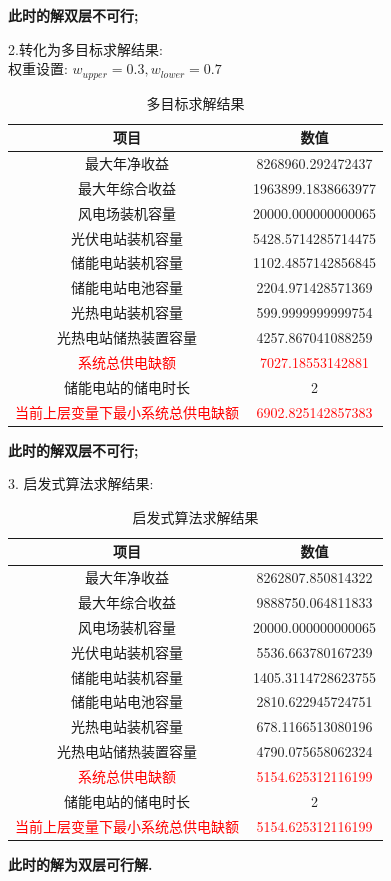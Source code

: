 \documentclass{article}
\begin{document}
\bf{此时的解双层不可行};
    
2.转化为多目标求解结果: \\
权重设置: $w_{upper}=0.3, w_{lower}=0.7$

\begin{table}[H]
    \centering
    \caption{多目标求解结果}
    \label{tab:multi_objective_result}
    \begin{tabular}{c|c}
        \toprule
        \textbf{项目} & \textbf{数值} \\
        \midrule
        最大年净收益 & 8268960.292472437 \\
        最大年综合收益 & 1963899.1838663977 \\
        风电场装机容量 & 20000.000000000065 \\
        光伏电站装机容量 & 5428.5714285714475 \\
        储能电站装机容量 & 1102.4857142856845 \\
        储能电站电池容量 & 2204.971428571369 \\
        光热电站装机容量 & 599.9999999999754 \\
        光热电站储热装置容量 & 4257.867041088259 \\
        \textcolor{red}{系统总供电缺额} & \textcolor{red}{7027.18553142881} \\
        储能电站的储电时长 & 2 \\
        \textcolor{red}{当前上层变量下最小系统总供电缺额} & \textcolor{red}{6902.825142857383} \\
        \bottomrule
    \end{tabular}
\end{table}

\bf{此时的解双层不可行};

3. 启发式算法求解结果:
\begin{table}[H]
    \centering
    \caption{启发式算法求解结果}
    \label{tab:heuristic_result}
    \begin{tabular}{c|c}
        \toprule
        \textbf{项目} & \textbf{数值} \\
        \midrule
        最大年净收益 & 8262807.850814322 \\
        最大年综合收益 & 9888750.064811833 \\
        风电场装机容量 & 20000.000000000065 \\
        光伏电站装机容量 & 5536.663780167239 \\
        储能电站装机容量 & 1405.3114728623755 \\
        储能电站电池容量 & 2810.622945724751 \\
        光热电站装机容量 & 678.1166513080196 \\
        光热电站储热装置容量 & 4790.075658062324 \\
        \textcolor{red}{系统总供电缺额} & \textcolor{red}{5154.625312116199} \\
        储能电站的储电时长 & 2 \\
        \textcolor{red}{当前上层变量下最小系统总供电缺额} & \textcolor{red}{5154.625312116199} \\
        \bottomrule
    \end{tabular}
\end{table}

\bf{此时的解为双层可行解}.
\end{document}
